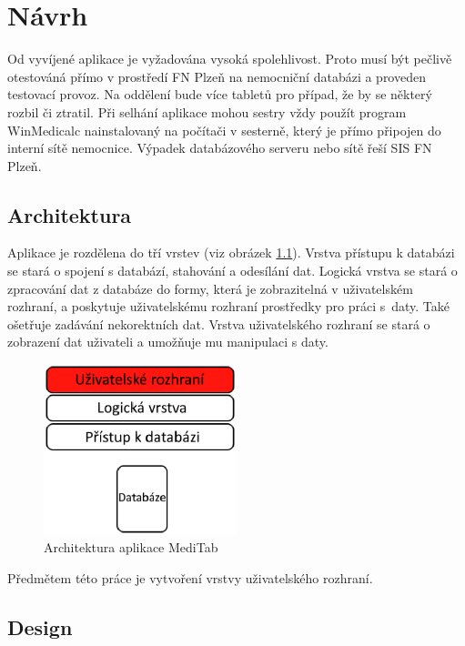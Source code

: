 \chapter{Návrh}
\label{ch:navrh}

Od vyvíjené aplikace je vyžadována vysoká spolehlivost. Proto musí být pečlivě otestováná přímo v prostředí FN Plzeň na nemocniční databázi a proveden testovací provoz. Na oddělení bude více tabletů pro případ, že by se některý rozbil či ztratil. Při selhání aplikace mohou sestry vždy použít program WinMedicalc nainstalovaný na počítači v sesterně, který je přímo připojen do interní sítě nemocnice. Výpadek databázového serveru nebo sítě řeší SIS FN Plzeň.

\section{Architektura}

Aplikace je rozdělena do tří vrstev (viz obrázek \ref{fig:architektura}). Vrstva přístupu k databázi se stará o spojení s databází, stahování a odesílání dat. Logická vrstva se stará o zpracování dat z databáze do formy, která je zobrazitelná v uživatelském rozhraní, a poskytuje uživatelskému rozhraní prostředky pro práci s~daty. Také ošetřuje zadávání nekorektních dat. Vrstva uživatelského rozhraní se stará o zobrazení dat uživateli a umožňuje mu manipulaci s daty.

\begin{figure}[H]
	\centering
	\includegraphics[width=0.5\textwidth]{img/architektura.eps}
	\caption{Architektura aplikace MediTab}
  \label{fig:architektura}
\end{figure}

Předmětem této práce je vytvoření vrstvy uživatelského rozhraní.


\section{Design}

